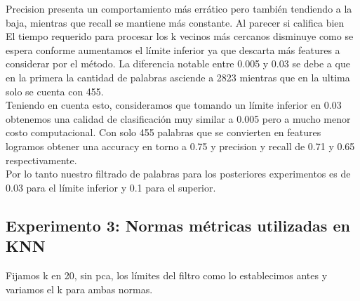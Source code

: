 Precision presenta un comportamiento más errático pero también tendiendo a la baja, mientras que recall se mantiene más constante. Al parecer si califica bien \\

El tiempo requerido para procesar los k vecinos más cercanos disminuye como se espera conforme aumentamos el límite inferior ya que descarta más features a considerar por el método. La diferencia notable entre 0.005 y 0.03 se debe a que en la primera la cantidad de palabras asciende a 2823 mientras que en la ultima solo se cuenta con 455. \\

Teniendo en cuenta esto, consideramos que tomando un límite inferior en 0.03 obtenemos una calidad de clasificación muy similar a 0.005 pero a mucho menor costo computacional. Con solo 455 palabras que se convierten en features logramos obtener una accuracy en torno a 0.75 y precision y recall de 0.71 y 0.65 respectivamente. \\
Por lo tanto nuestro filtrado de palabras para los posteriores experimentos es de 0.03 para el límite inferior y 0.1 para el superior. \\

\newpage
\subsection{Experimento 3: Normas métricas utilizadas en KNN}

Fijamos k en 20, sin pca, los límites del filtro como lo establecimos antes y variamos el k para ambas normas.\\

